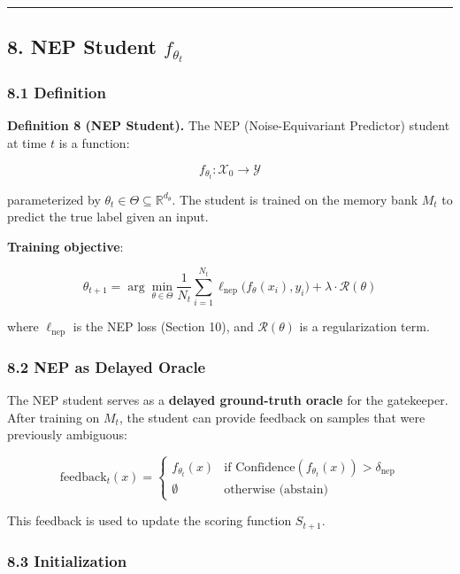\documentclass[
  12pt,
]{article}
\begin{document}
\begin{center}\rule{0.5\linewidth}{0.5pt}\end{center}

\subsection{\texorpdfstring{8. NEP Student
\(f_{\theta_t}\)}{8. NEP Student f\_\{\textbackslash theta\_t\}}}\label{nep-student-f_theta_t}

\subsubsection{8.1 Definition}\label{definition-4}

\textbf{Definition 8 (NEP Student).} The NEP (Noise-Equivariant
Predictor) student at time \(t\) is a function:

\[f_{\theta_t}: \mathcal{X}_0 \to \mathcal{Y}\]

parameterized by
\(\theta_t \in \Theta \subseteq \mathbb{R}^{d_\theta}\). The student is
trained on the memory bank \(M_t\) to predict the true label given an
input.

\textbf{Training objective}:

\[\theta_{t+1} = \arg\min_{\theta \in \Theta} \frac{1}{N_t} \sum_{i=1}^{N_t} \ell_{\text{nep}}\bigl( f_\theta(x_i), y_i \bigr) + \lambda \cdot \mathcal{R}(\theta)\]

where \(\ell_{\text{nep}}\) is the NEP loss (Section 10), and
\(\mathcal{R}(\theta)\) is a regularization term.

\subsubsection{8.2 NEP as Delayed Oracle}\label{nep-as-delayed-oracle}

The NEP student serves as a \textbf{delayed ground-truth oracle} for the
gatekeeper. After training on \(M_t\), the student can provide feedback
on samples that were previously ambiguous:

\[\text{feedback}_t(x) = \begin{cases}
f_{\theta_t}(x) & \text{if } \text{Confidence}(f_{\theta_t}(x)) > \delta_{\text{nep}} \\
\emptyset & \text{otherwise (abstain)}
\end{cases}\]

This feedback is used to update the scoring function \(S_{t+1}\).

\subsubsection{8.3 Initialization}\label{initialization}
\end{document}
